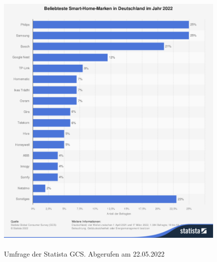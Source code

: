 \documentclass[
  ngerman           %
  ,twoside          %
  ,11pt
  ,pdftex
]{report}
\begin{document}
\chapter{}
\label{appendix:brandings}
\begin{figure}[hbt!]
  \centering
  \includegraphics[width=13.5cm,height=13.5cm,keepaspectratio]{chapter/9Anhang/beliebteste-smart-home-marken-in-deutschland-2022.png}
  \caption{Umfrage der Statista GCS. Abgerufen am 22.05.2022}
\end{figure}
\end{document}
